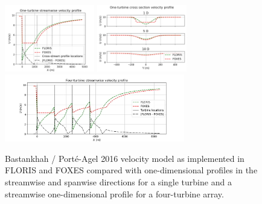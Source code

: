 \documentclass{iopconfser}
\begin{document}
\begin{figure}[]
\centering
\includegraphics[width=0.35\textwidth]{figures/b2016 1t x.png}
\includegraphics[width=0.35\textwidth]{figures/b2016 1t y.png}
\\
\includegraphics[width=0.7\textwidth]{figures/b2016 4t.png}
\caption{Bastankhah / Porté-Agel 2016 velocity model as implemented in FLORIS and FOXES compared with one-dimensional profiles in the streamwise and spanwise directions for a single turbine and a streamwise one-dimensional profile for a four-turbine array.}
\label{fig:b2016}
\end{figure}
\end{document}
